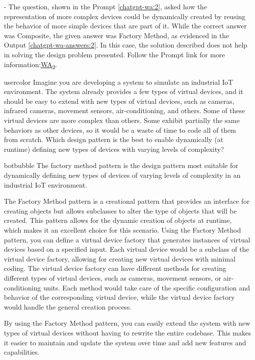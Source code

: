  - The question, shown in the Prompt \ref{chatgpt-wa:2}, asked how the representation of more complex devices could be dynamically created by reusing the behavior of more simple devices that are part of it. While the correct answer was Composite, the given answer was Factory Method, as evidenced in the Output \ref{chatgpt-wa-answers:2}. In this case, the solution described does not help in solving the design problem presented. Follow the Prompt link for more information:\href{https://chat.openai.com/share/15c618ec-4644-4c11-8698-48bfd0a6d177}{WA\textsubscript{2}}.
\begin{chatquest}{usercolor}{\chatgptquest[chatgpt-wa:2]}
Imagine you are developing a system to simulate an industrial IoT environment. The system already provides a few types of virtual devices, and it should be easy to extend with new types of virtual devices, such as cameras, infrared cameras, movement sensors, air-conditioning, and others. Some of these virtual devices are more complex than others. Some exhibit partially the same behaviors as other devices, so it would be a waste of time to code all of them from scratch. Which design pattern is the best to enable dynamically (at runtime) defining new types of devices with varying levels of complexity?
\end{chatquest}
\begin{chatout}{botbubble}{}
The factory method pattern is the design pattern most suitable for dynamically defining new types of devices of varying levels of complexity in an industrial IoT environment.

The Factory Method pattern is a creational pattern that provides an interface for creating objects but allows subclasses to alter the type of objects that will be created. This pattern allows for the dynamic creation of objects at runtime, which makes it an excellent choice for this scenario. Using the Factory Method pattern, you can define a virtual device factory that generates instances of virtual devices based on a specified input. Each virtual device would be a subclass of the virtual device factory, allowing for creating new virtual devices with minimal coding. The virtual device factory can have different methods for creating different types of virtual devices, such as cameras, movement sensors, or air-conditioning units. Each method would take care of the specific configuration and behavior of the corresponding virtual device, while the virtual device factory would handle the general creation process.

By using the Factory Method pattern, you can easily extend the system with new types of virtual devices without having to rewrite the entire codebase. This makes it easier to maintain and update the system over time and add new features and capabilities.
\end{chatout}    
